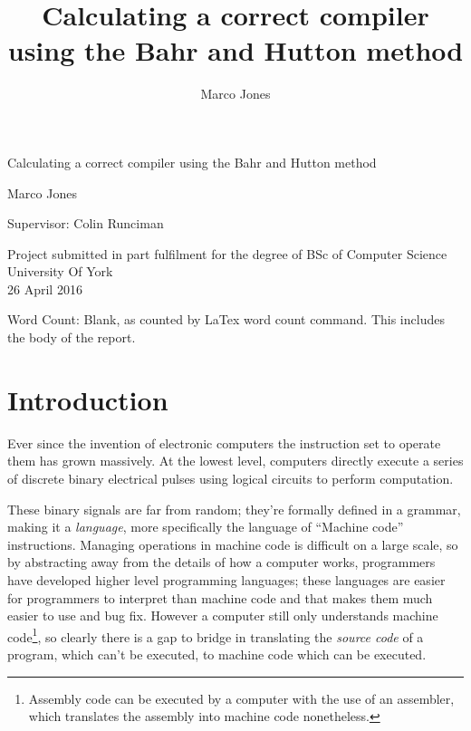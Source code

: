 \documentclass {article}
\title{Calculating a correct compiler using the Bahr and Hutton method}
\author{Marco Jones}
\begin{document}
\begin{titlepage}
    \begin{center}
        \vspace*{1cm}
        
        \Huge
         Calculating a correct compiler using the Bahr and Hutton method
        
        
        \vspace{2cm}
        \Large
        Marco Jones
        
       
        \vspace{1cm}
        \normalsize
        Supervisor: Colin Runciman
        
        \vspace{2.5cm}
        
                
        Project submitted in part fulfilment 
       for the degree of  BSc of  Computer Science \\

        \vspace{0.2cm}
   	University Of York\\
	\vspace{0.2cm}
 	26 April 2016
	
	\vspace{5cm}
	
	Word Count: Blank, as counted by LaTex word count command. This includes the body of the report.
        
    \end{center}
\end{titlepage}

\tableofcontents
\clearpage

\newcommand{\BH}{Bahr and Hutton}
\newcommand{\vm}{virtual machine}

\section{Introduction}

Ever since the invention of electronic computers
the instruction set to operate them has grown massively.
At the lowest level, computers directly execute
a series of discrete binary electrical
pulses using logical circuits to perform computation.

These binary signals are far from random; they're formally
defined in a grammar, making it a \emph{language},
more specifically the language of ``Machine code'' instructions.
Managing operations in machine code is difficult on
a large scale,
so by abstracting away from the details of how a computer works,
 programmers have developed 
higher level programming languages;
these languages are easier for programmers to interpret
than machine code and that makes them much easier to use and bug fix.
However a computer still only understands machine code\footnote{
Assembly code can be executed by a computer 
with the use of an assembler,
which translates the assembly 
into machine code nonetheless.},
so clearly there is a gap to bridge in translating the 
\emph{source code} of a program, which can't be
executed, to machine code which can be executed.
\end{document}
